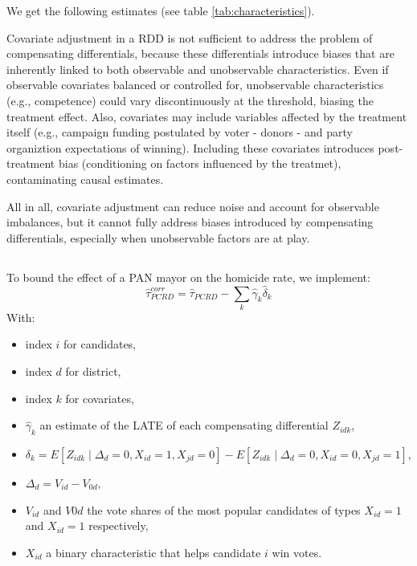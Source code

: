 \documentclass{article}
\begin{document}


We get the following estimates (see table \ref{tab:characteristics}).

Covariate adjustment in a RDD is not sufficient to address the problem of compensating differentials, because these differentials introduce biases that are inherently linked to both observable and unobservable characteristics. Even if observable covariates balanced or controlled for, unobservable characteristics (e.g., competence) could vary discontinuously at the threshold, biasing the treatment effect. Also, covariates may include variables affected by the treatment itself (e.g., campaign funding postulated by voter - donors - and party organiztion expectations of winning). Including these covariates introduces post-treatment bias (conditioning on factors influenced by the treatmet), contaminating causal estimates.

All in all, covariate adjustment can reduce noise and account for observable imbalances, but it cannot fully address biases introduced by compensating differentials, especially when unobservable factors are at play.


\subsection{}

To bound the effect of a PAN mayor on the homicide rate, we implement:
\[
\hat{\tau}^{corr}_{PCRD}
=\hat{\tau}_{PCRD}
-\sum_{k} \hat{\gamma}_k \hat{\delta}_k
\]
With:
\begin{itemize}
    \item index \(i\) for candidates,
    \item index \(d\) for district,
    \item index \(k\) for covariates,
    \item \(\hat{\gamma}_k\) an estimate of the LATE of each compensating differential \(Z_{idk}\),
    \item
    \(
    \delta_k
    =
    E[Z_{idk}\mid \Delta_d = 0, X_{id}=1, X_{jd}=0]
    -
    E[Z_{idk}\mid \Delta_d = 0, X_{id}=0, X_{jd}=1]
    \),
    \item
    \(
    \Delta_d
    =
    V_{id}-V_{0d}
    \),
    \item \( V_{id}\) and \(V{0d}\) the vote shares of the most popular candidates of types \(X_{id}=1\) and \(X_{id}=1\) respectively,
    \item  \(X_{id}\) a binary characteristic that helps candidate \(i\) win votes.
\end{itemize}
\end{document}
